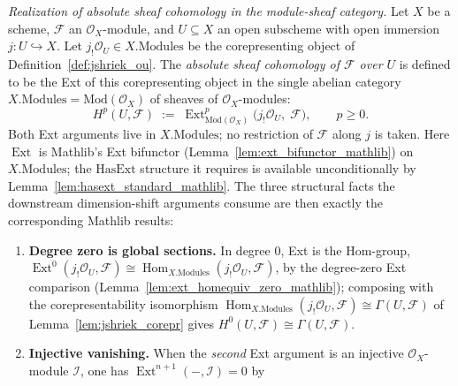 \begin{definition}\leanok
  \label{def:absolute_cohomology}
  \textit{Realization of absolute sheaf cohomology in the module-sheaf category.}
  Let \(X\) be a scheme, \(\mathcal{F}\) an \(\mathcal{O}_X\)-module, and \(U \subseteq
  X\) an open subscheme with open immersion \(j : U \hookrightarrow X\). Let
  \(j_!\mathcal{O}_U \in X.\mathrm{Modules}\) be the corepresenting object of
  Definition~\ref{def:jshriek_ou}. The \emph{absolute sheaf cohomology of \(\mathcal{F}\)
  over \(U\)} is defined to be the Ext of this corepresenting object in the single
  abelian category \(X.\mathrm{Modules} = \mathrm{Mod}(\mathcal{O}_X)\) of sheaves of
  \(\mathcal{O}_X\)-modules:
  \[
    H^p(U, \mathcal{F}) \;:=\; \operatorname{Ext}^p_{\mathrm{Mod}(\mathcal{O}_X)}
      \bigl(j_!\mathcal{O}_U,\; \mathcal{F}\bigr),
    \qquad p \geq 0.
  \]
  Both Ext arguments live in \(X.\mathrm{Modules}\); no restriction of \(\mathcal{F}\)
  along \(j\) is taken. Here \(\operatorname{Ext}\) is Mathlib's Ext bifunctor
  (Lemma~\ref{lem:ext_bifunctor_mathlib}) on \(X.\mathrm{Modules}\); the
  \(\mathrm{HasExt}\) structure it requires is available unconditionally by
  Lemma~\ref{lem:hasext_standard_mathlib}. The three structural facts the downstream
  dimension-shift arguments consume are then exactly the corresponding Mathlib results:
  \begin{enumerate}
  \item \textbf{Degree zero is global sections.} In degree \(0\), Ext is the Hom-group,
    \(\operatorname{Ext}^0(j_!\mathcal{O}_U, \mathcal{F}) \cong
    \operatorname{Hom}_{X.\mathrm{Modules}}(j_!\mathcal{O}_U, \mathcal{F})\), by the
    degree-zero Ext comparison (Lemma~\ref{lem:ext_homequiv_zero_mathlib}); composing
    with the corepresentability isomorphism
    \(\operatorname{Hom}_{X.\mathrm{Modules}}(j_!\mathcal{O}_U, \mathcal{F}) \cong
    \Gamma(U, \mathcal{F})\) of Lemma~\ref{lem:jshriek_corepr} gives \(H^0(U,
    \mathcal{F}) \cong \Gamma(U, \mathcal{F})\).
  \item \textbf{Injective vanishing.} When the \emph{second} Ext argument is an
    injective \(\mathcal{O}_X\)-module \(\mathcal{I}\), one has
    \(\operatorname{Ext}^{n+1}(-, \mathcal{I}) = 0\) by

\end{enumerate}
\end{definition}
